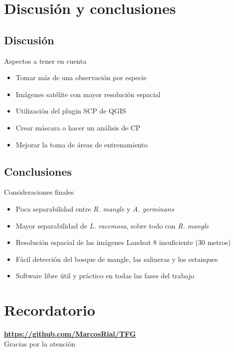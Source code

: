 \documentclass[12pt]{beamer}
\begin{document}
\section{Discusión y conclusiones}
\subsection{Discusión}
\begin{frame}
	\begin{block}{Aspectos a tener en cuenta}
		\begin{itemize}[<+->]
			\item Tomar más de una observación por especie
			\item Imágenes satélite con mayor resolución espacial
			\item Utilización del plugin SCP de QGIS
			\item Crear máscara o hacer un análisis de CP
			\item Mejorar la toma de áreas de entrenamiento
		\end{itemize}
	\end{block}
\end{frame}

\subsection{Conclusiones}
\begin{frame}
	\begin{block}{Consideraciones finales}
		\begin{itemize}[<+->]
			\item Poca separabilidad entre \textit{R. mangle} y \textit{A. germinans}
			\item Mayor separabilidad de \textit{L. racemosa}, sobre todo con \textit{R. mangle}
			\item Resolución espacial de las imágenes Landsat 8 insuficiente (30 metros)
			\item Fácil detección del bosque de mangle, las salineras y los estanques
			\item Software libre útil y práctico en todas las fases del trabajo
		\end{itemize}
	\end{block}
\end{frame}

\appendix
\section{Recordatorio}
	
%	
%	

\begin{frame}
	\centering
	{\large \textbf{{\color{blue} \url{https://github.com/MarcosRial/TFG}}}}\\ \vspace*{2cm}
	Gracias por la atención
\end{frame}
\end{document}
